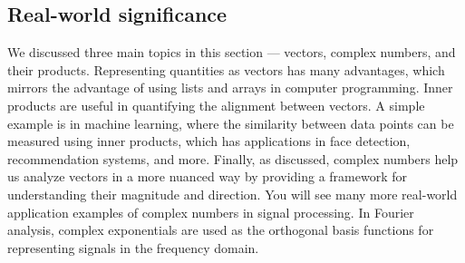 \subsection{Real-world significance}
We discussed three main topics in this section --- vectors, complex numbers, and their products.
Representing quantities as vectors has many advantages, which mirrors the advantage of using lists and arrays in computer programming. Inner products are useful in quantifying the alignment between vectors. A simple example is in machine learning, where the similarity between data points can be measured using inner products, which has applications in face detection, recommendation systems, and more. Finally, as discussed, complex numbers help us analyze vectors in a more nuanced way by providing a framework for understanding their magnitude and direction. You will see many more real-world application examples of complex numbers in signal processing. In Fourier analysis, complex exponentials are used as the orthogonal basis functions for representing signals in the frequency domain.

